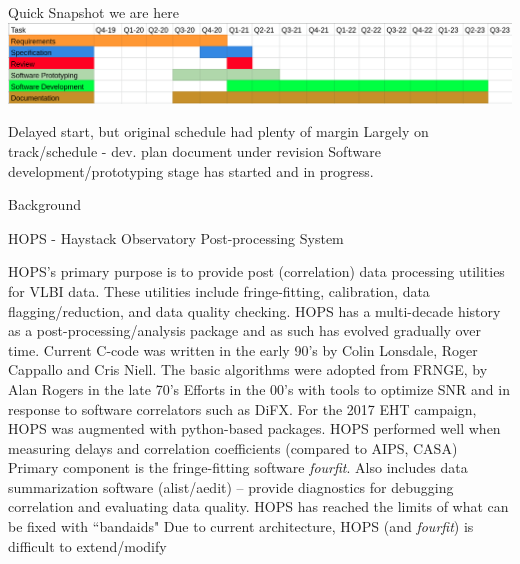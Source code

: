 \documentclass[8pt]{beamer}
\begin{document}

\begin{frame}[fragile]{Quick Snapshot}
\centering
{} we are here \\ \vspace{0.5cm} 
\includegraphics[width=\textwidth]{snapshot-schedule.png}

\begin{outline}
    \1 Delayed start, but original schedule had plenty of margin
    \1 Largely on track/schedule - dev. plan document under revision
    \1 Software development/prototyping stage has started and in progress.
\end{outline}
    
\end{frame}

\begin{frame}{Background}
    
    HOPS - Haystack Observatory Post-processing System
    
    \begin{outline}
      \1 HOPS's primary purpose is to provide post (correlation) data processing utilities for VLBI data. These utilities include fringe-fitting, calibration, data flagging/reduction, and data quality checking.
      \1 HOPS has a multi-decade history as a post-processing/analysis package and as such has evolved gradually over time.
        \2 Current C-code was written in the early 90’s by Colin Lonsdale, Roger Cappallo and Cris Niell. The basic algorithms were adopted from FRNGE, by Alan Rogers in the late 70's
        \2 Efforts in the 00's with tools to optimize SNR and in response to software correlators such as DiFX.
        \2 For the 2017 EHT campaign, HOPS was augmented with python-based packages. HOPS performed well when measuring delays and correlation coefficients (compared to AIPS, CASA)
      \1 Primary component is the fringe-fitting software \textit{fourfit}.
      \1 Also includes data summarization software (alist/aedit) -- provide diagnostics for debugging correlation and evaluating data quality.
      \1 HOPS has reached the limits of what can be fixed with ``bandaids"
      \1 Due to current architecture, HOPS (and \textit{fourfit}) is difficult to extend/modify
    \end{outline}
    
\end{frame}
\end{document}
